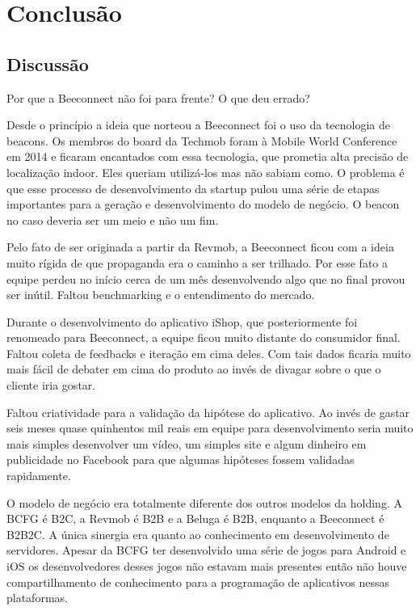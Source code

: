 \chapter{Conclusão}

\section{Discussão} %
\label{sec:discuss_o}
Por que a Beeconnect não foi para frente? O que deu errado?

Desde o princípio a ideia que norteou a Beeconnect foi o uso da tecnologia de beacons. Os membros do board da Techmob foram à Mobile World Conference em 2014 e ficaram encantados com essa tecnologia, que prometia alta precisão de localização indoor. Eles queriam utilizá-los mas não sabiam como. O problema é que esse processo de desenvolvimento da startup pulou uma série de etapas importantes para a geração e desenvolvimento do modelo de negócio. O beacon no caso deveria ser um meio e não um fim.

Pelo fato de ser originada a partir da Revmob, a Beeconnect ficou com a ideia muito rígida de que propaganda era o caminho a ser trilhado. Por esse fato a equipe perdeu no início cerca de um mês desenvolvendo algo que no final provou ser inútil. Faltou benchmarking e o entendimento do mercado.

Durante o desenvolvimento do aplicativo iShop, que posteriormente foi renomeado para Beeconnect, a equipe ficou muito distante do consumidor final. Faltou coleta de feedbacks e iteração em cima deles. Com tais dados ficaria muito mais fácil de debater em cima do produto ao invés de divagar sobre o que o cliente iria gostar.

Faltou criatividade para a validação da hipótese do aplicativo. Ao invés de gastar seis meses quase quinhentos mil reais em equipe para desenvolvimento seria muito mais simples desenvolver um vídeo, um simples site e algum dinheiro em publicidade no Facebook para que algumas hipóteses fossem validadas rapidamente.

O modelo de negócio era totalmente diferente dos outros modelos da holding. A BCFG é B2C, a Revmob é B2B e a Beluga é B2B, enquanto a Beeconnect é B2B2C. A única sinergia era quanto ao conhecimento em desenvolvimento de servidores. Apesar da BCFG ter desenvolvido uma série de jogos para Android e iOS os desenvolvedores desses jogos não estavam mais presentes então não houve compartilhamento de conhecimento para a programação de aplicativos nessas plataformas.

